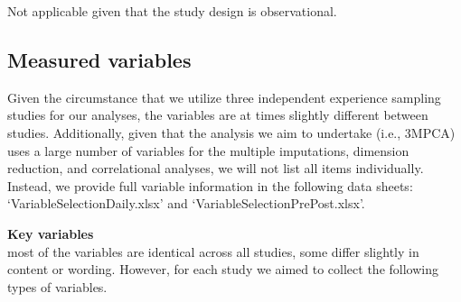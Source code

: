 \documentclass[]{article}
\begin{document}
Not applicable given that the study design is observational.

\hypertarget{measured-variables}{%
\subsection{Measured variables}\label{measured-variables}}

Given the circumstance that we utilize three independent experience
sampling studies for our analyses, the variables are at times slightly
different between studies. Additionally, given that the analysis we aim
to undertake (i.e., 3MPCA) uses a large number of variables for the
multiple imputations, dimension reduction, and correlational analyses,
we will not list all items individually. Instead, we provide full
variable information in the following data sheets:
`VariableSelectionDaily.xlsx' and `VariableSelectionPrePost.xlsx'.

\textbf{Key variables}\\
 most of the variables are identical across all studies,
 some differ slightly in content or wording. However,
for each study we aimed to collect the following types of variables.
\end{document}
